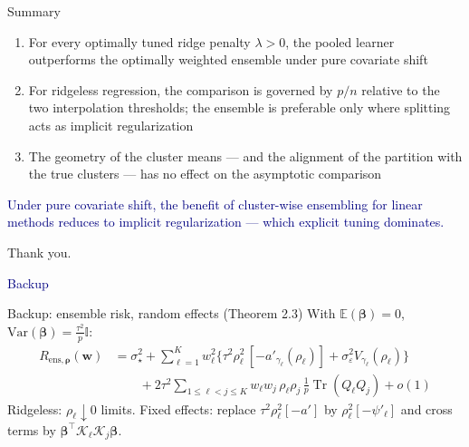 \documentclass[aspectratio=169,11pt]{beamer}
\newcommand{\E}{\mathbb{E}}
\newcommand{\Tr}{\operatorname{Tr}}
\newcommand{\bbeta}{\bm{\beta}}
\begin{document}
\begin{frame}{Summary}
  \begin{enumerate}
    \item For every optimally tuned ridge penalty $\lambda > 0$, the pooled learner outperforms the optimally weighted ensemble under pure covariate shift
    \item For ridgeless regression, the comparison is governed by $p/n$ relative to the two interpolation thresholds; the ensemble is preferable only where splitting acts as implicit regularization
    \item The geometry of the cluster means --- and the alignment of the partition with the true clusters --- has no effect on the asymptotic comparison
  \end{enumerate}
  \vspace{4mm}
  \begin{center}
    \colorbox{navy!10}{\parbox{0.85\textwidth}{\centering\textcolor{navy}{Under pure covariate shift, the benefit of cluster-wise ensembling for linear methods reduces to implicit regularization --- which explicit tuning dominates.}}}
  \end{center}
  \vspace{2mm}
  \centering Thank you.
\end{frame}

\begin{frame}[plain]
  \centering\Huge\textcolor{navy}{Backup}
\end{frame}

\begin{frame}{Backup: ensemble risk, random effects (Theorem 2.3)}
  \small
  With $\E(\bbeta) = 0$, $\mathrm{Var}(\bbeta) = \tfrac{\tau^2}{p}\mathbb{I}$:
  \begin{align*}
    R_{\mathrm{ens},\bm\rho}(\bm w)
    &= \sigma_\star^2
    + \sum_{\ell=1}^{K} w_\ell^2 \Big\{ \tau^2 \rho_\ell^2\,[-a'_{\gamma_\ell}(\rho_\ell)] + \sigma_\varepsilon^2 V_{\gamma_\ell}(\rho_\ell) \Big\}\\
    &\qquad + 2\tau^2 \!\!\sum_{1 \le \ell < j \le K}\!\! w_\ell w_j\, \rho_\ell \rho_j\, \tfrac1p \Tr(Q_\ell Q_j) + o(1)
  \end{align*}
  Ridgeless: $\rho_\ell \downarrow 0$ limits. Fixed effects: replace $\tau^2\rho_\ell^2[-a']$ by $\rho_\ell^2[-\psi'_\ell]$ and cross terms by $\bbeta^\top \mathcal{K}_\ell \mathcal{K}_j \bbeta$.
\end{frame}
\end{document}
